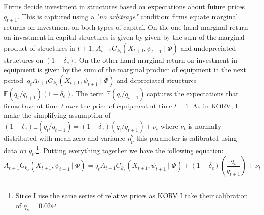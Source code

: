 \documentclass[12pt]{article}
\begin{document}
Firms decide investment in structures based on expectations about future prices $q_{t+1}$. This is captured using a \textit{"no arbitrage"} condition: firms equate marginal returns on investment on both types of capital. On the one hand marginal return on investment in capital structures is given by given by the sum of the marginal product of structures in $t+1$, $A_{t+1} G_{k_s}(X_{t+1}, \psi_{t+1} \mid \Phi )$ and undepreciated structures on $(1-\delta_s)$. On the other hand marginal return on investment in equipment is given by the sum of the marginal product of equipment in the next period, $q_t A_{t+1} G_{k_s}(X_{t+1}, \psi_{t+1} \mid \Phi )$ and depreciated structures $\mathbb{E}(q_t/q_{t+1})(1-\delta_e)$. The term $\mathbb{E}(q_t/q_{t+1})$ captures the expectations that firms have at time $t$ over the price of equipment at time $t+1$. As in KORV, I make the simplifying assumption of 
$(1-\delta_e)\mathbb{E}(q_t/q_{t+1}) =(1-\delta_e)(q_t/q_{t+1}) + \nu_t$ where $\nu_t$ is normally distributed with mean zero and variance $\eta_\nu^2$ this parameter is calibrated using data on $q_t$.\footnote{Since I use the same series of relative prices as KORV I take their calibration of $\eta_\nu = 0.02$}. Putting everything together we have the following equation:
\begin{equation}\label{eq:no_arbitrage}
 A_{t+1} G_{k_s}(X_{t+1}, \psi_{t+1} \mid \Phi ) = q_t A_{t+1} G_{k_s}(X_{t+1}, \psi_{t+1} \mid \Phi ) + (1-\delta_e)\left(\frac{q_t}{q_{t+1}}\right) + \nu_t
\end{equation}
\end{document}

